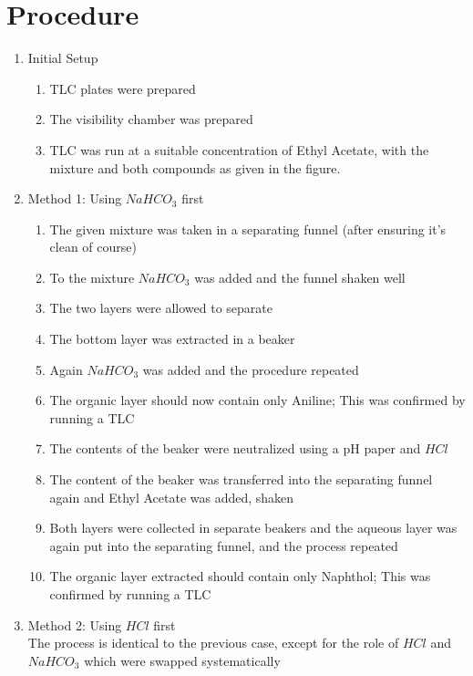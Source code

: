 \section{Procedure}	
	\begin{enumerate}
		\item Initial Setup
			\begin{enumerate}
				\item TLC plates were prepared
				\item The visibility chamber was prepared
				\item TLC was run at a suitable concentration of Ethyl Acetate, with the mixture and both compounds as given in the figure.
			\end{enumerate}
		\item Method 1: Using $NaHCO_3$ first
			\begin{enumerate}
				\item The given mixture was taken in a separating funnel (after ensuring it's clean of course)
				\item To the mixture $NaHCO_3$ was added and the funnel shaken well
				\item The two layers were allowed to separate
				\item The bottom layer was extracted in a beaker
				\item Again $NaHCO_3$ was added and the procedure repeated
				\item The organic layer should now contain only Aniline; This was confirmed by running a TLC
				\item The contents of the beaker were neutralized using a pH paper and $HCl$
				\item The content of the beaker was transferred into the separating funnel again and Ethyl Acetate was added, shaken
				\item Both layers were collected in separate beakers and the aqueous layer was again put into the separating funnel, and the process repeated
				\item The organic layer extracted should contain only Naphthol; This was confirmed by running a TLC
			\end{enumerate}
		\item Method 2: Using $HCl$ first\\			
			The process is identical to the previous case, except for the role of $HCl$ and $NaHCO_3$ which were swapped systematically
	\end{enumerate}
